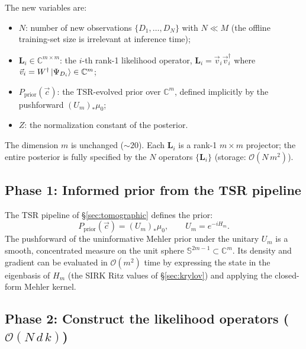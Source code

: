 \documentclass[11pt, a4paper]{article}
\newcommand{\Cset}{\mathbb{C}}
\begin{document}
The new variables are:
\begin{itemize}
\item $N$: number of new observations $\{D_1,\dots,D_N\}$ with $N\ll M$
  (the offline training-set size is irrelevant at inference time);
\item $\mathbf L_i\in\Cset^{m\times m}$: the $i$-th rank-1 likelihood
  operator, $\mathbf L_i=\vec v_i\vec v_i^\dagger$ where
  $\vec v_i=W^\dagger\ket{\Psi_{D_i}}\in\Cset^m$;
\item $P_{\mathrm{prior}}(\vec c)$: the TSR-evolved prior over
  $\Cset^m$, defined implicitly by the pushforward
  $(U_m)_*\mu_0$;
\item $Z$: the normalization constant of the posterior.
\end{itemize}
The dimension $m$ is unchanged ($\sim 20$). Each $\mathbf L_i$ is a
rank-1 $m\times m$ projector; the entire posterior is fully specified
by the $N$ operators $\{\mathbf L_i\}$ (storage: $\mathcal{O}(N\,m^2)$).

\subsection{Phase 1: Informed prior from the TSR pipeline}

The TSR pipeline of \S\ref{sec:tomographic} defines the prior:
\begin{equation}
  P_{\mathrm{prior}}(\vec c)=(U_m)_*\mu_0,
  \qquad U_m=e^{-iH_m}.
  \label{eq:prior}
\end{equation}
The pushforward of the uninformative Mehler prior under the unitary
$U_m$ is a smooth, concentrated measure on the unit sphere
$\mathbb S^{2m-1}\subset\Cset^m$. Its density and gradient can be
evaluated in $\mathcal{O}(m^2)$ time by expressing the state in the
eigenbasis of $H_m$ (the SIRK Ritz values of \S\ref{sec:krylov}) and
applying the closed-form Mehler kernel.

\subsection{Phase 2: Construct the likelihood operators ($\mathcal{O}(N\,d\,k)$)}
\end{document}
